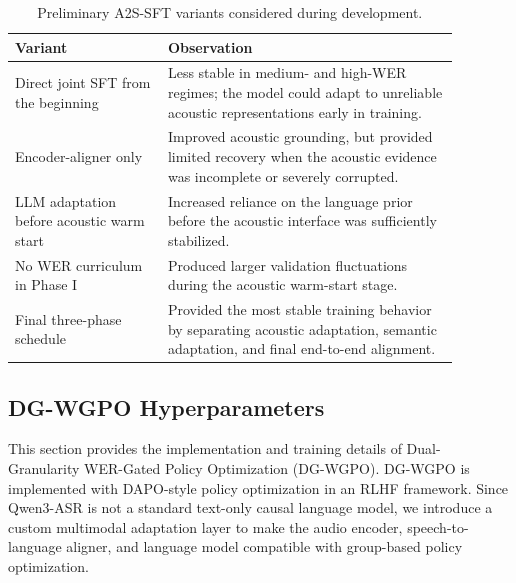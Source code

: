 \documentclass{article}
\begin{document}
\begin{table}[t]
\centering
\small
\caption{
Preliminary A2S-SFT variants considered during development.
}
\label{tab:a2s_sft_variants}
\renewcommand{\arraystretch}{1.12}
\begin{tabular}{p{0.30\linewidth} p{0.58\linewidth}}
\toprule
\textbf{Variant} & \textbf{Observation} \\
\midrule

Direct joint SFT from the beginning
& Less stable in medium- and high-WER regimes; the model could adapt to
unreliable acoustic representations early in training. \\

Encoder-aligner only
& Improved acoustic grounding, but provided limited recovery when the acoustic
evidence was incomplete or severely corrupted. \\

LLM adaptation before acoustic warm start
& Increased reliance on the language prior before the acoustic interface was
sufficiently stabilized. \\

No WER curriculum in Phase I
& Produced larger validation fluctuations during the acoustic warm-start stage. \\

Final three-phase schedule
& Provided the most stable training behavior by separating acoustic adaptation,
semantic adaptation, and final end-to-end alignment. \\
\bottomrule
\end{tabular}
\vspace{-2mm}
\end{table}

\subsection{DG-WGPO Hyperparameters}
\label{app:dg_wgpo_hparams}

This section provides the implementation and training details of
Dual-Granularity WER-Gated Policy Optimization (DG-WGPO). DG-WGPO is implemented
with DAPO-style policy optimization in an RLHF framework. Since Qwen3-ASR is not a
standard text-only causal language model, we introduce a custom multimodal
adaptation layer to make the audio encoder, speech-to-language aligner, and
language model compatible with group-based policy optimization.
\end{document}

